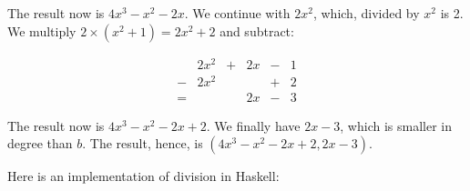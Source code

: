 \documentclass[tikz]{scrreprt}
\begin{document}
The result now is 
$4x^3 - x^2 - 2x$.
We continue with $2x^2$, which,
divided by $x^2$ is 2. 
We multiply $2\times (x^2 + 1) = 2x^2 + 2$
and subtract:

\begin{equation}
\begin{array}{ccrcrcrcr}
  & 2x^2 & + & 2x & - & 1\\
- & 2x^2 &   &    & + & 2\\
= &      &   & 2x & - & 3 
\end{array}
\end{equation}

The result now is
$4x^3 - x^2 - 2x + 2$.
We finally have $2x - 3$,
which is smaller in degree than $b$.
The result, hence, is
$(4x^3 - x^2 - 2x + 2, 2x - 3)$.

Here is an implementation of division in Haskell:
\end{document}
